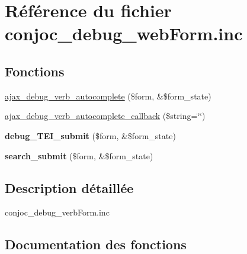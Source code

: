 \hypertarget{conjoc__debug__webForm_8inc}{}\section{Référence du fichier conjoc\+\_\+debug\+\_\+web\+Form.\+inc}
\label{conjoc__debug__webForm_8inc}
\subsection*{Fonctions}
\begin{DoxyCompactItemize}
\item 
\hyperlink{conjoc__debug__webForm_8inc_aafe244ee66a2c6e333d48efccec9164f}{ajax\+\_\+debug\+\_\+verb\+\_\+autocomplete} (\$form, \&\$form\+\_\+state)
\item 
\hyperlink{conjoc__debug__webForm_8inc_aedd67c4b770b58826708010ce4ef7ac7}{ajax\+\_\+debug\+\_\+verb\+\_\+autocomplete\+\_\+callback} (\$string=\char`\"{}\char`\"{})
\item 
\hypertarget{conjoc__debug__webForm_8inc_af6a94ce95f29fca17e5a3fb82855e835}{}\label{conjoc__debug__webForm_8inc_af6a94ce95f29fca17e5a3fb82855e835} 
{\bfseries debug\+\_\+\+T\+E\+I\+\_\+submit} (\$form, \&\$form\+\_\+state)
\item 
\hypertarget{conjoc__debug__webForm_8inc_a11d1063e5c7b2bf2e290639c78266d71}{}\label{conjoc__debug__webForm_8inc_a11d1063e5c7b2bf2e290639c78266d71} 
{\bfseries search\+\_\+submit} (\$form, \&\$form\+\_\+state)
\end{DoxyCompactItemize}


\subsection{Description détaillée}
conjoc\+\_\+debug\+\_\+verb\+Form.\+inc 

\subsection{Documentation des fonctions}
\hypertarget{conjoc__debug__webForm_8inc_aafe244ee66a2c6e333d48efccec9164f}{}\label{conjoc__debug__webForm_8inc_aafe244ee66a2c6e333d48efccec9164f} 

